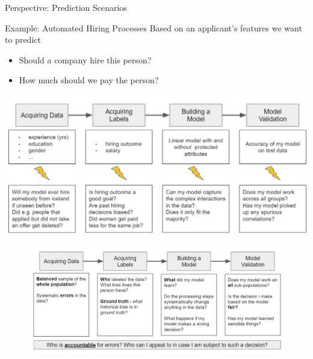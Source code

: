 \begin{vbframe}{Perspective: Prediction Scenarios}
\end{vbframe}

\begin{vbframe}{Example: Automated Hiring Processes}
Based on an applicant's features we want to predict 

\begin{itemize}
    \item Should a company hire this person?
    \item How much should we pay the person?
\end{itemize}
\vfill

\begin{center}
\includegraphics[width = \textwidth]{figure_man/acc-hiring-example1.png}


\end{center}

\framebreak

\null
\vfill
\begin{figure}[h]
\begin{center}
\includegraphics[width = \textwidth]{figure_man/acc-hiring-example2.png}
\end{center}

\end{figure}
\vfill

\end{vbframe}
